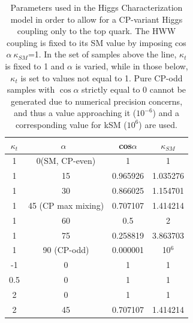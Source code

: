 \begin{table}[h!]
\centering
\begin{tabular}{|c|c|||c|c|}
\hline
$\kappa_{t}$ & $\alpha$\ & cos$\alpha$ & $\kappa_{SM}$\\
\hline
1 & 0(SM, CP-even) & 1 & 1 \\
1 & 15 & 0.965926 & 1.035276 \\
1 & 30 & 0.866025 & 1.154701 \\
1 & 45 (CP max mixing) & 0.707107 & 1.414214 \\
1 & 60 & 0.5 & 2 \\
1 & 75 & 0.258819 & 3.863703 \\
1 & 90 (CP-odd)  & 0.000001 & 10$^{6}$ \\
  \hline \hline
 -1 & 0 & 1 & 1 \\
 0.5 & 0 & 1 & 1 \\
 2 & 0 & 1 & 1 \\
 2 & 45 & 0.707107 & 1.414214 \\
\hline
\end{tabular}
\caption{Parameters used in the Higgs Characterization model in order to allow for a CP-variant Higgs coupling only to the top quark. The HWW coupling is fixed to its SM value by imposing cos$\alpha~\kappa_{SM}$=1. In the set of samples above the line, $\kappa_{t}$ is fixed to 1 and $\alpha$ is varied, while in those below, $\kappa_{t}$ is set to values not equal to 1. Pure CP-odd samples with $\cos\alpha$ strictly equal to 0 cannot be generated due to numerical precision concerns, and thus a value approaching it ($10^{-6}$) and a corresponding value for kSM ($10^{6}$) are used.}
\label{tab:MCsamples_Parameters}
\end{table}

